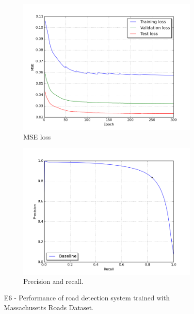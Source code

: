 \begin{figure}[!ht]
\begin{subfigure}{0.48\textwidth}
\includegraphics[width=\linewidth]{figs/E6/E6_lc_loss.png}
\caption{MSE loss} \label{fig:E6_performance_mass_lc}
\end{subfigure}
\hspace*{\fill} %
\begin{subfigure}{0.48\textwidth}
\includegraphics[width=\linewidth]{figs/E6/E6_pr.png}
\caption{Precision and recall.} \label{fig:E6_performance_mass_pr}
\end{subfigure}
\hspace*{\fill} %
\caption{E6 - Performance of road detection system trained with Massachusetts Roads Dataset.} \label{fig:E6_performance_mass}
\end{figure}

